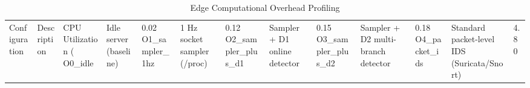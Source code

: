 \begin{table}
\caption{Edge Computational Overhead Profiling}
\label{tab:t3}
\begin{tabular}{llllll}
\toprule
Configuration & Description & CPU Utilization (%
\midrule
O0_idle & Idle server (baseline) & 0.02%
O1_sampler_1hz & 1 Hz socket sampler (/proc) & 0.12%
O2_sampler_plus_d1 & Sampler + D1 online detector & 0.15%
O3_sampler_plus_d2 & Sampler + D2 multi-branch detector & 0.18%
O4_packet_ids & Standard packet-level IDS (Suricata/Snort) & 4.80%
\bottomrule
\end{tabular}
\end{table}
